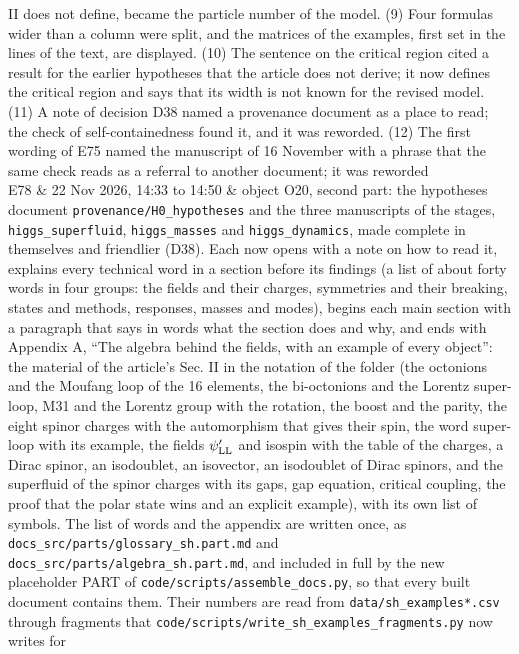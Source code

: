 \documentclass[
  10pt,
]{article}
\begin{document}
\begin{longtable}[]
II does not define, became the particle number of the model. (9) Four
formulas wider than a column were split, and the matrices of the
examples, first set in the lines of the text, are displayed. (10) The
sentence on the critical region cited a result for the earlier
hypotheses that the article does not derive; it now defines the critical
region and says that its width is not known for the revised model. (11)
A note of decision D38 named a provenance document as a place to read;
the check of self-containedness found it, and it was reworded. (12) The
first wording of E75 named the manuscript of 16 November with a phrase
that the same check reads as a referral to another document; it was
reworded \\
E78 & 22 Nov 2026, 14:33 to 14:50 & object O20, second part: the
hypotheses document \texttt{provenance/H0\_hypotheses} and the three
manuscripts of the stages, \texttt{higgs\_superfluid},
\texttt{higgs\_masses} and \texttt{higgs\_dynamics}, made complete in
themselves and friendlier (D38). Each now opens with a note on how to
read it, explains every technical word in a section before its findings
(a list of about forty words in four groups: the fields and their
charges, symmetries and their breaking, states and methods, responses,
masses and modes), begins each main section with a paragraph that says
in words what the section does and why, and ends with Appendix A, ``The
algebra behind the fields, with an example of every object'': the
material of the article's Sec. II in the notation of the folder (the
octonions and the Moufang loop of the 16 elements, the bi-octonions and
the Lorentz super-loop, M31 and the Lorentz group with the rotation, the
boost and the parity, the eight spinor charges with the automorphism
that gives their spin, the word super-loop with its example, the fields
\(\psi'_{\rm LL}\) and isospin with the table of the charges, a Dirac
spinor, an isodoublet, an isovector, an isodoublet of Dirac spinors, and
the superfluid of the spinor charges with its gaps, gap equation,
critical coupling, the proof that the polar state wins and an explicit
example), with its own list of symbols. The list of words and the
appendix are written once, as
\texttt{docs\_src/parts/glossary\_sh.part.md} and
\texttt{docs\_src/parts/algebra\_sh.part.md}, and included in full by
the new placeholder PART of \texttt{code/scripts/assemble\_docs.py}, so
that every built document contains them. Their numbers are read from
\texttt{data/sh\_examples*.csv} through fragments that
\texttt{code/scripts/write\_sh\_examples\_fragments.py} now writes for

\end{longtable}
\end{document}
